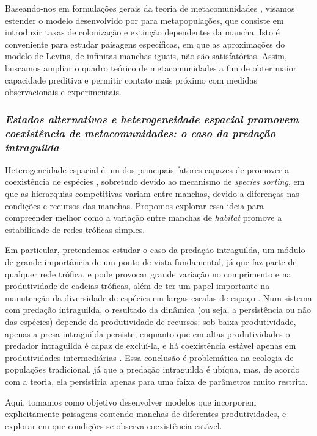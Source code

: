 \documentclass[12pt]{extarticle}
\begin{document}
Baseando-nos em formulações gerais da teoria de metacomunidades
\citep{pillai2010}, visamos estender o modelo desenvolvido por
\citet{ovaskainen2001} para metapopulações, que consiste em introduzir taxas
de colonização e extinção dependentes da mancha. Isto é conveniente para
estudar paisagens específicas, em que as aproximações do modelo de Levins, de
infinitas manchas iguais, não são satisfatórias. Assim, buscamos ampliar o
quadro teórico de metacomunidades a fim de obter maior capacidade preditiva e
permitir contato mais próximo com medidas observacionais e experimentais.

\subsubsection*{\em Estados alternativos e heterogeneidade espacial promovem
coexistência de metacomunidades: o caso da predação intraguilda}

Heterogeneidade espacial é um dos principais fatores capazes de promover a
coexistência de espécies \citep{amarasekare2003}, sobretudo devido ao
mecanismo de \emph{species sorting}, em que as hierarquias competitivas variam entre manchas, 
devido a diferenças nas condições e recursos das manchas. 
Propomos explorar essa ideia para compreender melhor
como a variação entre manchas de \emph{habitat} promove a estabilidade de
redes tróficas simples.

Em particular, pretendemos estudar o caso da predação intraguilda, um módulo
de grande importância de um ponto de vista fundamental, já que faz parte de
qualquer rede trófica, e pode provocar grande variação no comprimento e na
produtividade de cadeias tróficas, além de ter um papel importante na
manutenção da diversidade de espécies em largas escalas de espaço
\citep{mccann2011}. Num sistema com predação intraguilda, o resultado da
dinâmica (ou seja, a persistência ou não das espécies) depende da
produtividade de recursos: sob baixa produtividade, apenas a presa intraguilda
persiste, enquanto que em altas produtividades o predador intraguilda é capaz
de excluí-la, e há coexistência estável apenas em produtividades
intermediárias \citep{holt1997}. Essa conclusão é problemática na ecologia de
populações tradicional, já que a predação intraguilda é ubíqua, mas, de acordo
com a teoria, ela persistiria apenas para uma faixa de parâmetros muito
restrita.

Aqui, tomamos como objetivo desenvolver modelos que incorporem explicitamente
paisagens contendo manchas de diferentes produtividades, e explorar em que
condições se observa coexistência estável.
\end{document}
